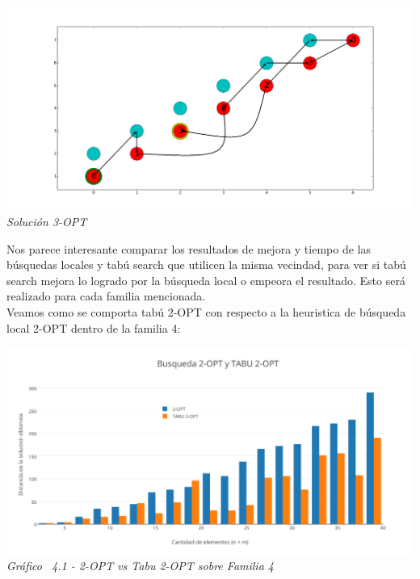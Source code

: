 \vspace*{0.3cm} \vspace*{0.3cm}
  \begin{center}
 \includegraphics[scale=0.3]{./EJ4/fam43opt.png}\\
 {            \textit{Soluci\'on 3-OPT}}
  \end{center}
  \vspace*{0.3cm}

Nos parece interesante comparar los resultados de mejora y tiempo de las búsquedas locales y tabú search que utilicen la misma vecindad, para ver si tabú search mejora lo logrado por la búsqueda local o empeora el resultado. Esto será realizado para cada familia mencionada.\\

Veamos como se comporta tabú 2-OPT con respecto a la heuristica de búsqueda local 2-OPT dentro de la familia 4:

\vspace*{0.3cm} \vspace*{0.3cm}
  \begin{center}
 \includegraphics[scale=0.5]{./EJ4/comparativogym02opt.png}\\
 {            \textit{Gráfico \ 4.1 - 2-OPT vs Tabu 2-OPT sobre Familia 4}}
  \end{center}
  \vspace*{0.3cm}

